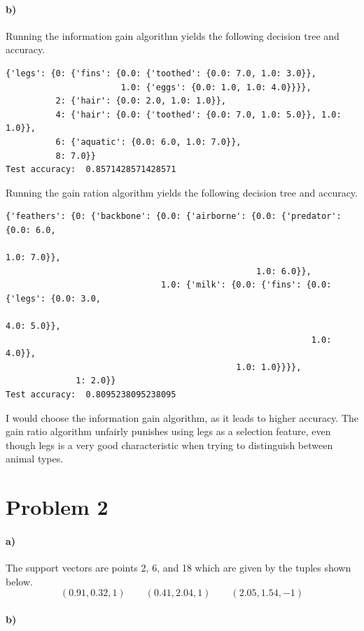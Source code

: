 \documentclass[12pt]{article}
\begin{document}
\paragraph{b)}

Running the information gain algorithm yields the following decision tree and accuracy.
\scriptsize
\begin{verbatim}
{'legs': {0: {'fins': {0.0: {'toothed': {0.0: 7.0, 1.0: 3.0}},
                       1.0: {'eggs': {0.0: 1.0, 1.0: 4.0}}}},
          2: {'hair': {0.0: 2.0, 1.0: 1.0}},
          4: {'hair': {0.0: {'toothed': {0.0: 7.0, 1.0: 5.0}}, 1.0: 1.0}},
          6: {'aquatic': {0.0: 6.0, 1.0: 7.0}},
          8: 7.0}}
Test accuracy:  0.8571428571428571
\end{verbatim}
\normalsize
Running the gain ration algorithm yields the following decision tree and accuracy.
\scriptsize
\begin{verbatim}
{'feathers': {0: {'backbone': {0.0: {'airborne': {0.0: {'predator': {0.0: 6.0,
                                                                     1.0: 7.0}},
                                                  1.0: 6.0}},
                               1.0: {'milk': {0.0: {'fins': {0.0: {'legs': {0.0: 3.0,
                                                                            4.0: 5.0}},
                                                             1.0: 4.0}},
                                              1.0: 1.0}}}},
              1: 2.0}}
Test accuracy:  0.8095238095238095
\end{verbatim}
\normalsize
I would choose the information gain algorithm, as it leads to higher accuracy. The gain
ratio algorithm unfairly punishes using legs as a selection feature, even though legs
is a very good characteristic when trying to distinguish between animal types.

\section*{Problem 2}

\paragraph{a)}

The support vectors are points 2, 6, and 18 which are given by the tuples shown below.
\[(0.91, 0.32, 1)\qquad (0.41, 2.04, 1)\qquad(2.05, 1.54, -1)\]

\paragraph{b)}
\end{document}
